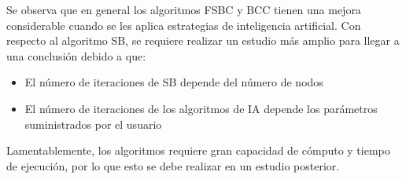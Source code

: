 Se observa que en general los algoritmos FSBC y BCC tienen una mejora considerable cuando se les aplica estrategias de inteligencia artificial. Con respecto al algoritmo SB, se requiere realizar un estudio más amplio para llegar a una conclusión debido a que:

\begin{itemize}
    \item El número de iteraciones de SB depende del número de nodos
    \item El número de iteraciones de los algoritmos de IA depende los parámetros suministrados por el usuario
\end{itemize}

Lamentablemente, los algoritmos requiere gran capacidad de cómputo y tiempo de ejecución, por lo que esto se debe realizar en un estudio posterior.